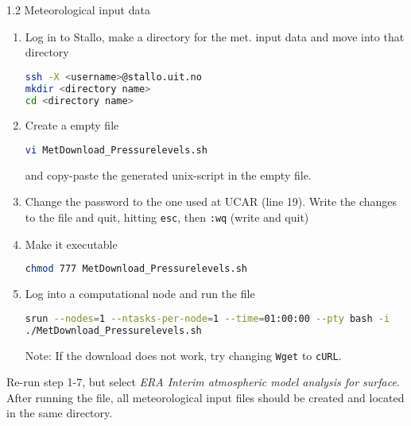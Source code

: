 \documentclass[xcolor=table]{beamer}
\begin{document}
\begin{frame}[fragile, allowframebreaks=1, t]{1.2 Meteorological input data}
\begin{enumerate}
\item Log in to Stallo, make a directory for the met. input data and move into that directory
\begin{lstlisting}[backgroundcolor = \color{light-gray}, language=bash]
ssh -X <username>@stallo.uit.no
mkdir <directory name>
cd <directory name>
\end{lstlisting}
\item Create a empty file
\begin{lstlisting}[backgroundcolor = \color{light-gray}, language=bash]
vi MetDownload_Pressurelevels.sh 
\end{lstlisting}
and copy-paste the generated unix-script in the empty file. 
\item Change the password to the one used at UCAR (line 19). Write the changes to the file and quit, hitting \texttt{esc}, then \texttt{:wq} (write and quit)
\item Make it executable
\begin{lstlisting}[backgroundcolor = \color{light-gray}, language=bash]
chmod 777 MetDownload_Pressurelevels.sh
\end{lstlisting}
\item Log into a computational node and run the file
\begin{lstlisting}[backgroundcolor = \color{light-gray}, language=bash]
srun --nodes=1 --ntasks-per-node=1 --time=01:00:00 --pty bash -i
./MetDownload_Pressurelevels.sh
\end{lstlisting}
Note: If the download does not work, try changing \texttt{Wget} to \texttt{cURL}.
\end{enumerate}
Re-run step 1-7, but select \textit{ERA Interim atmospheric model analysis for surface}. After running the file, all meteorological input files should be created and located in the same directory. 
\end{frame}
\end{document}
